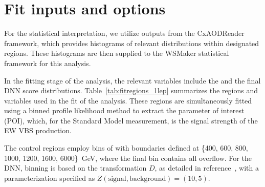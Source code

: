 \clearpage
\section{Fit inputs and options}
\label{subsec:fit_options}


For the statistical interpretation, we utilize outputs from the CxAODReader framework, which provides histograms of relevant distributions within designated regions. These histograms are then supplied to the WSMaker statistical framework for this analysis.

In the fitting stage of the analysis, the relevant variables include the \mjjtag and the final DNN score distributions. Table~\ref{tab:fitregions_1lep} summarizes the regions and variables used in the fit of the analysis. These regions are simultaneously fitted using a binned profile likelihood method to extract the parameter of interest (POI), which, for the Standard Model measurement, is the signal strength of the EW VBS production.

The control regions employ bins of \mjjtag with boundaries defined at \{400, 600, 800, 1000, 1200, 1600, 6000\}~GeV, where the final bin contains all overflow. For the DNN, binning is based on the transformation $D$, as detailed in reference~\cite{Buscher:2232472}, with a parameterization specified as $Z(\text{signal}, \text{background}) = (10,5)$.




